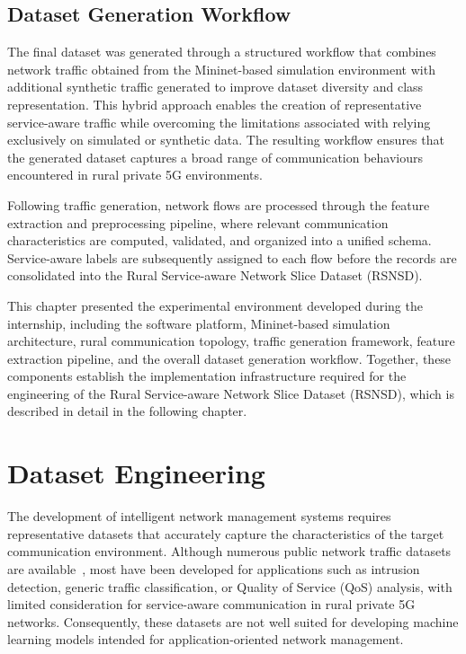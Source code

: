 \documentclass[12pt,a4paper]{report}
\begin{document}
	\section{Dataset Generation Workflow}
	\label{sec:dataset_pipeline}
	
	The final dataset was generated through a structured workflow that combines network traffic obtained from the Mininet-based simulation environment with additional synthetic traffic generated to improve dataset diversity and class representation. This hybrid approach enables the creation of representative service-aware traffic while overcoming the limitations associated with relying exclusively on simulated or synthetic data. The resulting workflow ensures that the generated dataset captures a broad range of communication behaviours encountered in rural private 5G environments.
	
	Following traffic generation, network flows are processed through the feature extraction and preprocessing pipeline, where relevant communication characteristics are computed, validated, and organized into a unified schema. Service-aware labels are subsequently assigned to each flow before the records are consolidated into the Rural Service-aware Network Slice Dataset (RSNSD).
	
	This chapter presented the experimental environment developed during the internship, including the software platform, Mininet-based simulation architecture, rural communication topology, traffic generation framework, feature extraction pipeline, and the overall dataset generation workflow. Together, these components establish the implementation infrastructure required for the engineering of the Rural Service-aware Network Slice Dataset (RSNSD), which is described in detail in the following chapter.
	
	
	
	\chapter{Dataset Engineering}
	\label{chap:dataset_engineering}
	
	The development of intelligent network management systems requires representative datasets that accurately capture the characteristics of the target communication environment. Although numerous public network traffic datasets are available~\cite{shiravi2012toward}, most have been developed for applications such as intrusion detection, generic traffic classification, or Quality of Service (QoS) analysis, with limited consideration for service-aware communication in rural private 5G networks. Consequently, these datasets are not well suited for developing machine learning models intended for application-oriented network management.
	
\end{document}
